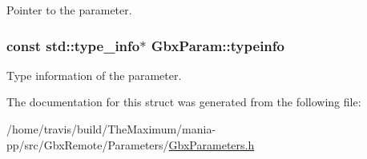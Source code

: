Pointer to the parameter. 

\hypertarget{structGbxParam_afb3596a5ba95fda1e27a5c6b4ed517b5}{
\subsubsection[{typeinfo}]{\setlength{\rightskip}{0pt plus 5cm}const std\-::type\-\_\-info$\ast$ Gbx\-Param\-::typeinfo}}\label{structGbxParam_afb3596a5ba95fda1e27a5c6b4ed517b5}


Type information of the parameter. 



The documentation for this struct was generated from the following file\-:\begin{DoxyCompactItemize}
\item 
/home/travis/build/\-The\-Maximum/mania-\/pp/src/\-Gbx\-Remote/\-Parameters/\hyperlink{GbxParameters_8h}{Gbx\-Parameters.\-h}\end{DoxyCompactItemize}
